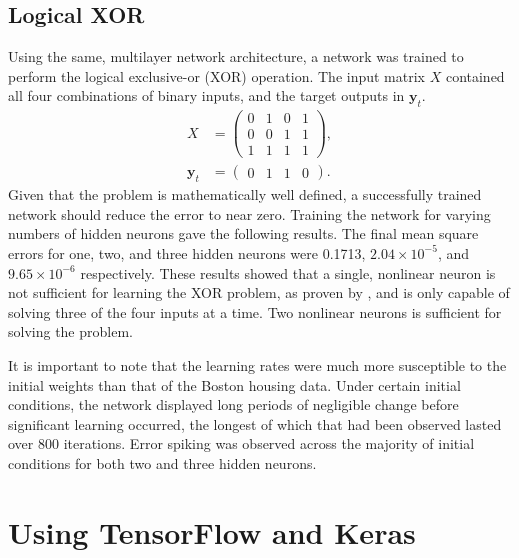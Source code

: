 \subsection{Logical XOR}

Using the same, multilayer network architecture, a network was trained to
perform the logical exclusive-or (XOR) operation.
The input matrix $X$ contained all four combinations of binary inputs, and the
target outputs in $\mathbf{y}_t$.
\begin{align*}
    X &= \begin{pmatrix}
        0 & 1 & 0 & 1 \\
        0 & 0 & 1 & 1 \\
        1 & 1 & 1 & 1
    \end{pmatrix},\\
    \mathbf{y}_t &= \begin{pmatrix}
        0 & 1 & 1 & 0
    \end{pmatrix}.
\end{align*}
Given that the problem is mathematically well defined, a successfully trained
network should reduce the error to near zero.
Training the network for varying numbers of hidden neurons gave the following
results.
\vspace{-2em}
The final mean square errors for one, two, and three hidden neurons were 0.1713,
$2.04\times10^{-5}$, and $9.65\times10^{-6}$ respectively.
These results showed that a single, nonlinear neuron is not sufficient for
learning the XOR problem, as proven by \cite{Minsky:1969:Perceptrons}, and is
only capable of solving three of the four inputs at a time.
Two nonlinear neurons is sufficient for solving the problem.

It is important to note that the learning rates were much more susceptible to
the initial weights than that of the Boston housing data.
Under certain initial conditions, the network displayed long periods of
negligible change before significant learning occurred, the longest of which
that had been observed lasted over 800 iterations.
Error spiking was observed across the majority of initial conditions for both
two and three hidden neurons.



\section{Using TensorFlow and Keras}

